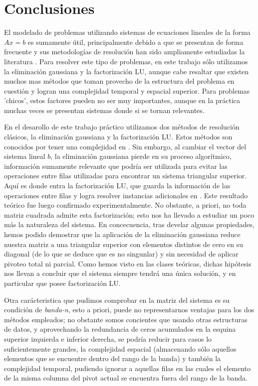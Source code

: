 \section{Conclusiones}

El modelado de problemas utilizando sistemas de ecuaciones lineales de la forma $Ax = b$ es sumamente útil, principalmente debido a que se presentan de forma frecuente y sus metodologías de resolución han sido ampliamente estudiadas la literatura	. Para resolver este tipo de problemas, en este trabajo sólo utilizamos la eliminación gaussiana y la factorización LU, aunque cabe resaltar que existen muchos mas métodos que toman provecho de la estructura del problema en cuestión y logran una complejidad temporal y espacial superior. Para problemas 'chicos', estos factores pueden no ser muy importantes, aunque en la práctica muchas veces se presentan sistemas donde si se tornan relevantes.

En el desarollo de este trabajo práctico utilizamos dos métodos de resolución clásicos, la eliminación gaussiana y la factorización LU. Estos métodos son conocidos por tener una complejidad en . Sin embargo, al cambiar el vector del sistema lineal $b$, la eliminación gaussiana pierde en su proceso algorítmico, información sumamente relevante que podría ser utilizada para evitar las operaciones entre filas utilizadas para encontrar un sistema triangular superior. Aquí es donde entra la factorización LU, que guarda la información de las operaciones entre filas y logra resolver instancias adicionales en . Este resultado teórico fue luego confirmado experimentalmente. No obstante, a priori, no toda matriz cuadrada admite esta factorización; esto nos ha llevado a estudiar un poco más la naturaleza del sistema. En concecuencia, tras develar algunas propiedades, hemos podido demostrar que la aplicación de la eliminación gaussiana reduce nuestra matriz a una triangular superior con elementos distintos de cero en su diagonal (de lo que se deduce que es no singunlar) y sin necesidad de aplicar pivoteo total ni parcial. Como hemos visto en las clases teóricas, dichas hipótesis nos llevan a concluir que el sistema siempre tendrá una única solución, y en particular que posee factorización LU.

Otra carácteristica que pudimos comprobar en la matriz del sistema es su condición de \textit{banda-n}, esto a priori, puede no representarnos ventajas para los dos métodos empleados; no obstante somos concientes que usando otras estructuras de datos, y aprovechando la redundancia de ceros acumulados en la esquina superior izquierda e inferior derecha, se podría reducir para casos lo suficientemente grandes, la complejidad espacial (almacenando sólo aquellos elementos que se encuentre dentro del rango de la banda) y también la complejidad temporal, pudiendo ignorar a aquellas filas en las cuales el elemento de la misma columna del pivot actual se encuentra fuera del rango de la banda. 

